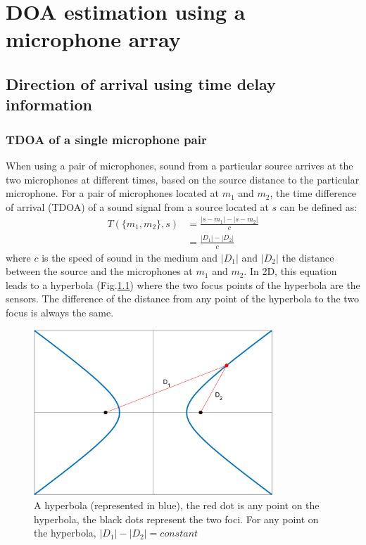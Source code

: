 \chapter{DOA estimation using a microphone array}
\section{Direction of arrival using time delay information}

\subsection{TDOA of a single microphone pair}\label{sec:TDOA}

When using a pair of microphones, sound from a particular source arrives at the two microphones at different times, based on the source distance to the particular microphone. For a pair of microphones located at $m_{1}$ and $m_{2}$, the time difference of arrival (TDOA) of a sound signal from a source located at $s$ can be defined as:
\begin{equation}
    \begin{split}
    T(\{m_{1},m_{2}\},s)&=\frac{|s-m_{1}|-|s-m_{2}|}{c}\\
                        &=\frac{|D_{1}|-|D_{2}|}{c}
    \label{eq:tdoa}
    \end{split}
\end{equation}
where $c$ is the speed of sound in the medium and $|D_{1}|$ and $|D_{2}|$ the distance between the source and the microphones at $m_1$ and $m_2$. In 2D, this equation leads to a hyperbola (Fig.\ref{eq:tdoa}) where the two focus points of the hyperbola are the sensors. The difference of the distance from any point of the hyperbola to the two focus is always the same.
\begin{figure}[!ht]
    \centering
    \includegraphics[width=0.8\textwidth]{Figures/hyperbola.png}
    \caption{A hyperbola (represented in blue), the red dot is any point on the hyperbola, the black dots represent the two foci. For any point on the hyperbola, $|D_1|-|D_2| = constant$}
    \label{eq:tdoa}
\end{figure}
